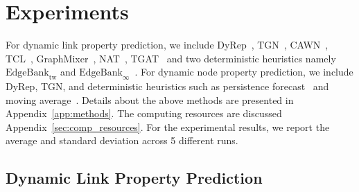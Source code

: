 \section{Experiments} \label{sec:exp}
\vspace{-8pt}
For dynamic link property prediction, we include DyRep~\cite{trivedi2019dyrep},  TGN~\cite{rossi2020temporal}, CAWN~\cite{wanginductive}, TCL~\cite{wang2021tcl}, GraphMixer~\cite{congwe}, NAT~\cite{luoneighborhood}, TGAT~\cite{xu2020inductive} and two deterministic heuristics namely $\text{EdgeBank}_{\text{tw}}$ and $\text{EdgeBank}_{\infty}$~\cite{poursafaeitowards}. For dynamic node property prediction, we include DyRep,  TGN, and deterministic heuristics such as persistence forecast~\cite{salcedo2022persistence} and moving average~\cite{panch2018artificial}. Details about the above methods are presented in Appendix~\ref{app:methods}. The computing resources are discussed Appendix~\ref{sec:comp_resources}.
For the experimental results, we report the average and standard deviation across 5 different runs. 





\subsection{Dynamic Link Property Prediction} \label{sub:node_exp}


